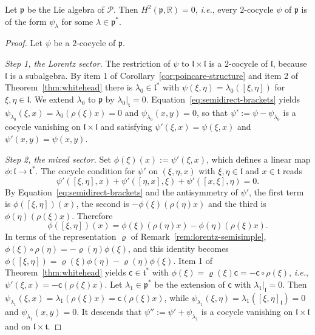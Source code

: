 \begin{theorem}\label{thm:poincare-cohomology}
	Let $\mathfrak{p}$ be the Lie algebra of $\mathcal{P}$. Then $H^2(\mathfrak{p},\mathbb{R})=0$, \textit{i.e.}, every $2$-cocycle $\psi$ of $\mathfrak{p}$ is of the form $\psi_\lambda$ for some $\lambda\in\mathfrak{p}^*$.
\end{theorem}

\begin{proof}
	Let $\psi$ be a $2$-cocycle of $\mathfrak{p}$.
	
	\emph{Step 1, the Lorentz sector.} The restriction of $\psi$ to $\mathfrak{l}\times\mathfrak{l}$ is a $2$-cocycle of $\mathfrak{l}$, because $\mathfrak{l}$ is a subalgebra. By item 1 of Corollary~\ref{cor:poincare-structure} and item 2 of Theorem~\ref{thm:whitehead} there is $\lambda_0\in\mathfrak{l}^*$ with $\psi(\xi,\eta)=\lambda_0([\xi,\eta])$ for $\xi,\eta\in\mathfrak{l}$. We extend $\lambda_0$ to $\mathfrak{p}$ by $\lambda_0|_{\mathfrak{t}}=0$. Equation~\eqref{eq:semidirect-brackets} yields $\psi_{\lambda_0}(\xi,x)=\lambda_0(\rho(\xi)x)=0$ and $\psi_{\lambda_0}(x,y)=0$, so that $\psi':=\psi-\psi_{\lambda_0}$ is a cocycle vanishing on $\mathfrak{l}\times\mathfrak{l}$ and satisfying $\psi'(\xi,x)=\psi(\xi,x)$ and $\psi'(x,y)=\psi(x,y)$.
	
	\emph{Step 2, the mixed sector.} Set $\phi(\xi)(x):=\psi'(\xi,x)$, which defines a linear map $\phi:\mathfrak{l}\to\mathfrak{t}^*$. The cocycle condition for $\psi'$ on $(\xi,\eta,x)$ with $\xi,\eta\in\mathfrak{l}$ and $x\in\mathfrak{t}$ reads
	\begin{equation*}
		\psi'([\xi,\eta],x)+\psi'([\eta,x],\xi)+\psi'([x,\xi],\eta)=0.
	\end{equation*}
	By Equation~\eqref{eq:semidirect-brackets} and the antisymmetry of $\psi'$, the first term is $\phi([\xi,\eta])(x)$, the second is $-\phi(\xi)(\rho(\eta)x)$ and the third is $\phi(\eta)(\rho(\xi)x)$. Therefore
	\begin{equation*}
		\phi([\xi,\eta])(x)=\phi(\xi)(\rho(\eta)x)-\phi(\eta)(\rho(\xi)x).
	\end{equation*}
	In terms of the representation $\varrho$ of Remark~\ref{rem:lorentz-semisimple}, $\phi(\xi)\circ\rho(\eta)=-\varrho(\eta)\phi(\xi)$, and this identity becomes $\phi([\xi,\eta])=\varrho(\xi)\phi(\eta)-\varrho(\eta)\phi(\xi)$. Item 1 of Theorem~\ref{thm:whitehead} yields $\mathsf{c}\in\mathfrak{t}^*$ with $\phi(\xi)=\varrho(\xi)\mathsf{c}=-\mathsf{c}\circ\rho(\xi)$, \textit{i.e.}, $\psi'(\xi,x)=-\mathsf{c}(\rho(\xi)x)$. Let $\lambda_1\in\mathfrak{p}^*$ be the extension of $\mathsf{c}$ with $\lambda_1|_{\mathfrak{l}}=0$. Then $\psi_{\lambda_1}(\xi,x)=\lambda_1(\rho(\xi)x)=\mathsf{c}(\rho(\xi)x)$, while $\psi_{\lambda_1}(\xi,\eta)=\lambda_1([\xi,\eta]_{\mathfrak{l}})=0$ and $\psi_{\lambda_1}(x,y)=0$. It descends that $\psi'':=\psi'+\psi_{\lambda_1}$ is a cocycle vanishing on $\mathfrak{l}\times\mathfrak{l}$ and on $\mathfrak{l}\times\mathfrak{t}$.
	

\end{proof}
